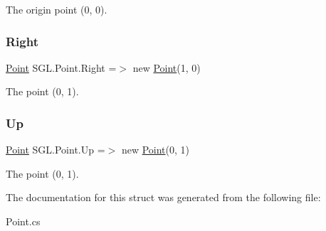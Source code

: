 The origin point (0, 0). 

\mbox{\label{struct_s_g_l_1_1_point_a320d6bfd5119b652d958b5f72e2f737c}} 
\subsubsection{\texorpdfstring{Right}{Right}}
{\footnotesize\ttfamily \mbox{\hyperlink{struct_s_g_l_1_1_point}{Point}} S\+G\+L.\+Point.\+Right =$>$ new \mbox{\hyperlink{struct_s_g_l_1_1_point}{Point}}(1, 0)\hspace{0.3cm}{\ttfamily [static]}}



The point (0, 1). 

\mbox{\label{struct_s_g_l_1_1_point_a08d6f7dd7dfb57c6e1be9ce0e7843b9d}} 
\subsubsection{\texorpdfstring{Up}{Up}}
{\footnotesize\ttfamily \mbox{\hyperlink{struct_s_g_l_1_1_point}{Point}} S\+G\+L.\+Point.\+Up =$>$ new \mbox{\hyperlink{struct_s_g_l_1_1_point}{Point}}(0, 1)\hspace{0.3cm}{\ttfamily [static]}}



The point (0, 1). 



The documentation for this struct was generated from the following file\+:\begin{DoxyCompactItemize}
\item 
Point.\+cs\end{DoxyCompactItemize}
